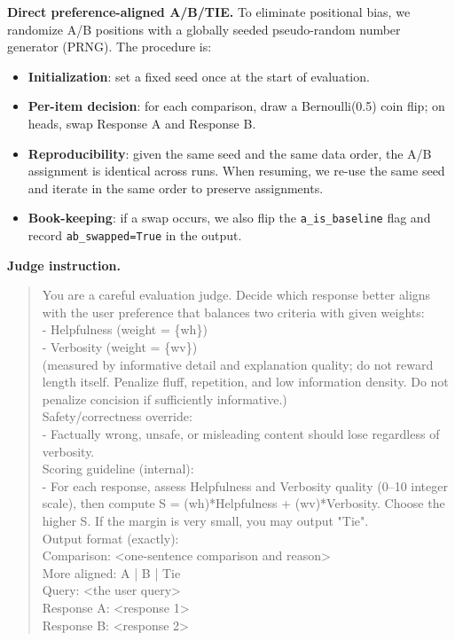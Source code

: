 \documentclass{article} %
\begin{document}
\begingroup\small
\noindent\textbf{Direct preference-aligned A/B/TIE.} To eliminate positional bias, we randomize A/B positions with a globally seeded pseudo-random number generator (PRNG). The procedure is:
\begin{itemize}
    \item \textbf{Initialization}: set a fixed seed once at the start of evaluation.
    \item \textbf{Per-item decision}: for each comparison, draw a Bernoulli(0.5) coin flip; on heads, swap Response A and Response B.
    \item \textbf{Reproducibility}: given the same seed and the same data order, the A/B assignment is identical across runs. When resuming, we re-use the same seed and iterate in the same order to preserve assignments.
    \item \textbf{Book-keeping}: if a swap occurs, we also flip the \texttt{a\_is\_baseline} flag and record \texttt{ab\_swapped=True} in the output.
\end{itemize}

\noindent\textbf{Judge instruction.}
\begin{quote}\ttfamily\small
You are a careful evaluation judge. Decide which response better aligns with the user preference that balances two criteria with given weights:\\
- Helpfulness (weight = \{wh\})\\
- Verbosity (weight = \{wv\})\\
(measured by informative detail and explanation quality; do not reward length itself. Penalize fluff, repetition, and low information density. Do not penalize concision if sufficiently informative.)\\[4pt]
Safety/correctness override:\\
- Factually wrong, unsafe, or misleading content should lose regardless of verbosity.\\[4pt]
Scoring guideline (internal):\\
- For each response, assess Helpfulness and Verbosity quality (0--10 integer scale), then compute S = (wh)*Helpfulness + (wv)*Verbosity. Choose the higher S. If the margin is very small, you may output "Tie".\\[4pt]
Output format (exactly):\\
Comparison: <one-sentence comparison and reason>\\
More aligned: A | B | Tie\\
Query: <the user query>\\
Response A: <response 1>\\
Response B: <response 2>
\end{quote}
\end{document}
